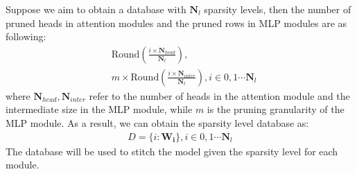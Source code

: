 Suppose we aim to obtain a database with $\bm N_l$ sparsity levels, then the number of pruned heads in attention modules and the pruned rows in MLP modules are as following:
\begin{align}
    &\text{Round}(\frac{i \times \bm N_{head}}{\bm N_l}),\\
    &m \times \text{Round}(\frac{i \times \bm N_{inter}}{\bm N_l}),
    i \in 0, 1 \cdots \bm N_l
\end{align}
where $\bm N_{head}, \bm N_{inter}$ refer to the number of heads in the attention module and the intermediate size in the MLP module, while $m$ is the pruning granularity of the MLP module. As a result, we can obtain the sparsity level database as:
\begin{align}
    D = \{i:  \mathbf{W_i}\}, i \in 0, 1 \cdots \bm N_l
\end{align}
The database will be used to stitch the model given the sparsity level for each module.



